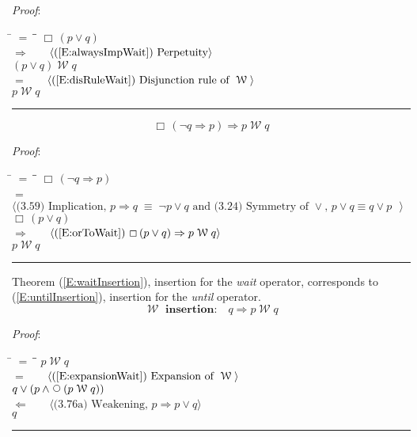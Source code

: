 \documentclass[12pt, fleqn, leqno]{article}
\newcommand{\lgap}{2pt}                             %
\newcommand{\mymathindent}{24pt}                    %
\newcommand{\equivs}{\ensuremath{\;\equiv\;}}       %
\newcommand{\impl}{\ensuremath{\Rightarrow}}        %
\newcommand{\foll}{\ensuremath{\Leftarrow}}         %
\newcommand{\Wait}{\;\mathcal{W}\;}
\newcommand{\Next}{\;\,\text{\raisebox{3.5pt}{\circle{6}}}}
\newcommand{\Always}{\Box\,}
\newcommand{\myqed}{\rule[-.23ex]{1.2ex}{2.0ex}}
\newcommand{\myqedtab}{\hspace{384pt}}              %
\newcommand{\Gll} {\langle}                         %
\newcommand{\Ggg} {\rangle}                         %
\newcommand{\Hint}[1]     {\ \ \ $\Gll              \mbox{#1} \Ggg$ }   %
\begin{document}
\emph{Proof}:
\begin{tabbing}
\hspace{\mymathindent} \= $= \;$ \= \myqedtab \= \kill
\> \> $\Always (p\lor q)$\\[\lgap]
\> $\impl$ \> \Hint{(\ref{E:alwaysImpWait}) Perpetuity} \\[\lgap]
\> \> $(p\lor q)\Wait q$\\[\lgap]
\> $=$ \> \Hint{(\ref{E:disRuleWait}) Disjunction rule of $\Wait$} \\[\lgap]
\> \> $p \Wait q$ \quad \myqed
\end{tabbing}
\begin{equation}\label{E:notqimpliespToWait}
\Always (\neg q \impl p) \impl p \Wait q
\end{equation}

\emph{Proof}:
\begin{tabbing}
\hspace{\mymathindent} \= $= \;$ \= \myqedtab \= \kill
\> \> $\Always (\neg q \impl p)$\\[\lgap]
\> $=$ \> \Hint{(3.59) Implication, $p\impl q \equivs \neg p \lor q$ and (3.24) Symmetry of $\lor$, $p\lor q \equiv q\lor p$ } \\[\lgap]
\> \> $\Always (p \lor q)$\\[\lgap]
\> $\impl$ \> \Hint{(\ref{E:orToWait}) $\Always (p\lor q) \impl p \Wait q$} \\[\lgap]
\> \> $p \Wait q$ \quad \myqed
\end{tabbing}

Theorem (\ref{E:waitInsertion}), insertion for the \textit{wait} operator, corresponds to
(\ref{E:untilInsertion}), insertion for the \textit{until} operator.
\begin{equation}\label{E:waitInsertion}
\textbf{$\Wait$ insertion:}\quad q \impl p \Wait q
\end{equation}

\emph{Proof}:
\begin{tabbing}
\hspace{\mymathindent} \= $= \;$ \= \myqedtab \= \kill
\> \> $p \Wait q$\\[\lgap]
\> $=$ \> \Hint{(\ref{E:expansionWait}) Expansion of $\Wait$} \\[\lgap]
\> \> $q \lor (p \land \Next(p \Wait q))$\\[\lgap]
\> $\foll$ \> \Hint{(3.76a) Weakening, $p\impl p\lor q$} \\[\lgap]
\> \> $q$ \quad \myqed
\end{tabbing}
\end{document}
